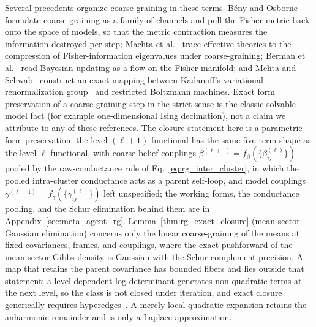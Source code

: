 Several precedents organize coarse-graining in these terms. B\'eny and Osborne~\cite{beny2015information} formulate coarse-graining as a family of channels and pull the Fisher metric back onto the space of models, so that the metric contraction measures the information destroyed per step; Machta et al.~\cite{Machta2013} trace effective theories to the compression of Fisher-information eigenvalues under coarse-graining; Berman et al.~\cite{BermanKlingerStapleton2023} read Bayesian updating as a flow on the Fisher manifold; and Mehta and Schwab~\cite{mehta2014exact} construct an exact mapping between Kadanoff's variational renormalization group~\cite{Kadanoff1975, KadanoffHoughtonYalabik1976} and restricted Boltzmann machines. Exact form preservation of a coarse-graining step in the strict sense is the classic solvable-model fact (for example one-dimensional Ising decimation), not a claim we attribute to any of these references. The closure statement here is a parametric form preservation: the level-$(\ell+1)$ functional has the same five-term shape as the level-$\ell$ functional, with coarse belief couplings $\beta^{(\ell+1)} = f_\beta(\{\beta_{ij}^{(\ell)}\})$ pooled by the raw-conductance rule of Eq.~\eqref{eq:rg_inter_cluster}, in which the pooled intra-cluster conductance acts as a parent self-loop, and model couplings $\gamma^{(\ell+1)} = f_\gamma(\{\gamma_{ij}^{(\ell)}\})$ left unspecified; the working forms, the conductance pooling, and the Schur elimination behind them are in Appendix~\ref{sec:meta_agent_rg}. Lemma~\ref{thm:rg_exact_closure} (mean-sector Gaussian elimination) concerns only the linear coarse-graining of the means at fixed covariances, frames, and couplings, where the exact pushforward of the mean-sector Gibbs density is Gaussian with the Schur-complement precision. A map that retains the parent covariance has bounded fibers and lies outside that statement; a level-dependent log-determinant generates non-quadratic terms at the next level, so the class is not closed under iteration, and exact closure generically requires hyperedges~\cite[Ch.~11, the hyperedge-generation proposition]{DennisGaugeVFE2026}. A merely local quadratic expansion retains the anharmonic remainder and is only a Laplace approximation.

